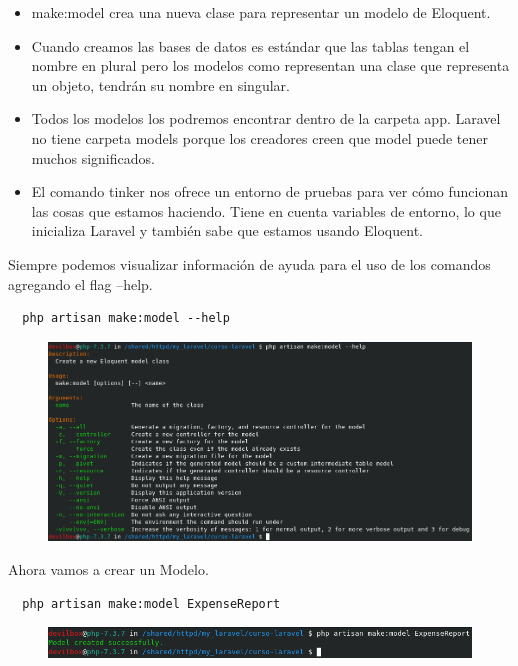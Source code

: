 \documentclass{article}
\begin{document}
\begin{itemize}
  \item make:model crea una nueva clase para representar un modelo de Eloquent.
  \item Cuando creamos las bases de datos es estándar que las tablas tengan el
    nombre en plural pero los modelos como representan una clase que representa
    un objeto, tendrán su nombre en singular.
  \item Todos los modelos los podremos encontrar dentro de la carpeta app.
    Laravel no tiene carpeta models porque los creadores creen que model puede
    tener muchos significados.
  \item El comando tinker nos ofrece un entorno de pruebas para ver cómo
    funcionan las cosas que estamos haciendo. Tiene en cuenta variables de
    entorno, lo que inicializa Laravel y también sabe que estamos usando
    Eloquent.
\end{itemize}

Siempre podemos visualizar información de ayuda para el uso de los comandos
agregando el flag --help.

\begin{verbatim}
  php artisan make:model --help
\end{verbatim}

\begin{figure}[h!]
  \centering
  \includegraphics[scale=0.5]{./Pictures/038_make_model_help.png}
\end{figure}

Ahora vamos a crear un Modelo.

\begin{verbatim}
  php artisan make:model ExpenseReport
\end{verbatim}

\begin{figure}[h!]
  \centering
  \includegraphics[scale=0.5]{./Pictures/039_model_created.png}
\end{figure}
\end{document}
